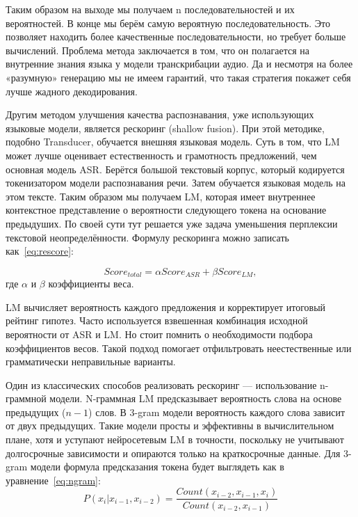 Таким образом на выходе мы получаем n последовательностей и их вероятностей.
В конце мы берём самую вероятную последовательность.
Это позволяет находить более качественные последовательности, но требует больше вычислений.
Проблема метода заключается в том, что он полагается на внутренние знания языка у модели транскрибации аудио.
Да и несмотря на более «разумную» генерацию мы не имеем гарантий, что такая стратегия покажет себя лучше жадного декодирования.

Другим методом улучшения качества распознавания, уже использующих языковые модели, является рескоринг (shallow fusion).
При этой методике, подобно Transducer, обучается внешняя языковая модель.
Суть в том, что LM может лучше оценивает естественность и грамотность предложений, чем основная модель ASR.
Берётся большой текстовый корпус, который кодируется токенизатором модели распознавания речи.
Затем обучается языковая модель на этом тексте.
Таким образом мы получаем LM, которая имеет внутреннее контекстное представление о вероятности следующего токена на основание предыдуших.
По своей сути тут решается уже задача уменьшения перплексии текстовой неопределённости.
Формулу рескоринга можно записать как~\ref{eq:rescore}:

\begin{equation}
  Score_{total} = \alpha Score_{ASR} + \beta Score_{LM},
  \label{eq:rescore}
\end{equation}
где $\alpha$ и $\beta$ коэффициенты веса.

LM вычисляет вероятность каждого предложения и корректирует итоговый рейтинг гипотез.
Часто используется взвешенная комбинация исходной вероятности от ASR и LM.
Но стоит помнить о необходимости подбора коэффициентов весов.
Такой подход помогает отфильтровать неестественные или грамматически неправильные варианты.

Один из классических способов реализовать рескоринг — использование n-граммной модели.
N-граммная LM предсказывает вероятность слова на основе предыдущих ($n-1$) слов.
В 3-gram модели вероятность каждого слова зависит от двух предыдущих.
Такие модели просты и эффективны в вычислительном плане, хотя и уступают нейросетевым LM в точности, поскольку не учитывают долгосрочные зависимости и опираются только на краткосрочные данные.
Для 3-gram модели формула предсказания токена будет выглядеть как в уравнение~\ref{eq:ngram}:
\begin{equation}
  P(x_i|x_{i-1},x_{i-2}) = \frac{Count(x_{i-2}, x_{i-1}, x_{i})}{Count(x_{i-2}, x_{i-1})}
  \label{eq:ngram}
\end{equation}

